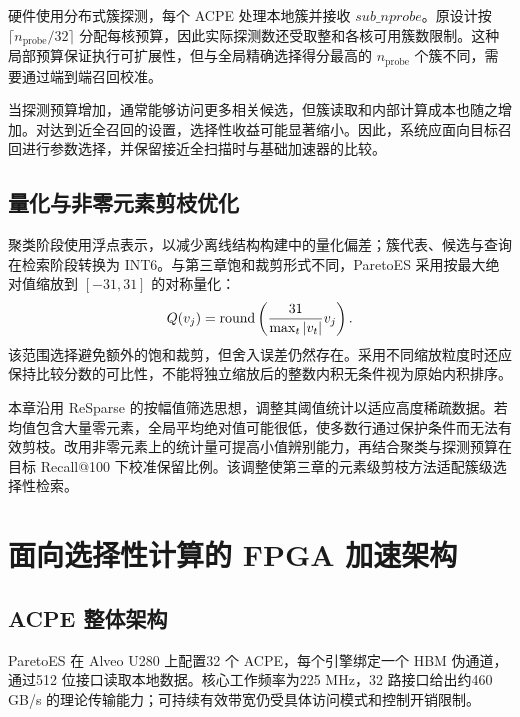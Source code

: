 硬件使用分布式簇探测，每个 ACPE 处理本地簇并接收 $sub\_nprobe$。原设计按 $\lceil n_{\mathrm{probe}}/32\rceil$ 分配每核预算，因此实际探测数还受取整和各核可用簇数限制。这种局部预算保证执行可扩展性，但与全局精确选择得分最高的 $n_{\mathrm{probe}}$ 个簇不同，需要通过端到端召回校准。

当探测预算增加，通常能够访问更多相关候选，但簇读取和内部计算成本也随之增加。对达到近全召回的设置，选择性收益可能显著缩小。因此，系统应面向目标召回进行参数选择，并保留接近全扫描时与基础加速器的比较。

\subsection{量化与非零元素剪枝优化}
聚类阶段使用浮点表示，以减少离线结构构建中的量化偏差；簇代表、候选与查询在检索阶段转换为 INT6。与第三章饱和裁剪形式不同，ParetoES 采用按最大绝对值缩放到 $[-31,31]$ 的对称量化：
\begin{equation}
 Q(v_j)=\operatorname{round}\left(\frac{31}{\max_t|v_t|}v_j\right).
\end{equation}
该范围选择避免额外的饱和裁剪，但舍入误差仍然存在。采用不同缩放粒度时还应保持比较分数的可比性，不能将独立缩放后的整数内积无条件视为原始内积排序。

本章沿用 ReSparse 的按幅值筛选思想，调整其阈值统计以适应高度稀疏数据。若均值包含大量零元素，全局平均绝对值可能很低，使多数行通过保护条件而无法有效剪枝。改用非零元素上的统计量可提高小值辨别能力，再结合聚类与探测预算在目标 Recall@100 下校准保留比例。该调整使第三章的元素级剪枝方法适配簇级选择性检索。

\section{面向选择性计算的 FPGA 加速架构}
\subsection{ACPE 整体架构}
ParetoES 在 Alveo U280 上配置32 个 ACPE，每个引擎绑定一个 HBM 伪通道，通过512 位接口读取本地数据。核心工作频率为225 MHz，32 路接口给出约460 GB/s 的理论传输能力；可持续有效带宽仍受具体访问模式和控制开销限制。


